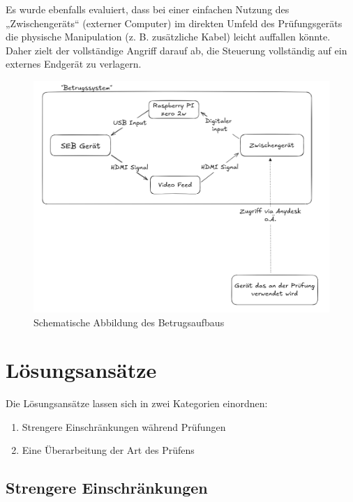 \documentclass[14pt]{article}
\begin{document}
Es wurde ebenfalls evaluiert, dass bei einer einfachen Nutzung des „Zwischengeräts“ (externer Computer) im direkten Umfeld des Prüfungsgeräts die physische Manipulation (z. B. zusätzliche Kabel) leicht auffallen könnte. Daher zielt der vollständige Angriff darauf ab, die Steuerung vollständig auf ein externes Endgerät zu verlagern. 

\begin{figure}[h!]
	
	\includegraphics[width=\linewidth]{./images/schematic1.png}
	\caption{Schematische Abbildung des Betrugsaufbaus}

\end{figure}


\newpage
\section{Lösungsansätze}

Die Lösungsansätze lassen sich in zwei Kategorien einordnen: 

\begin{enumerate}
\item Strengere Einschränkungen während Prüfungen
\item Eine Überarbeitung der Art des Prüfens
\end{enumerate}

\subsection{Strengere Einschränkungen}
\end{document}
